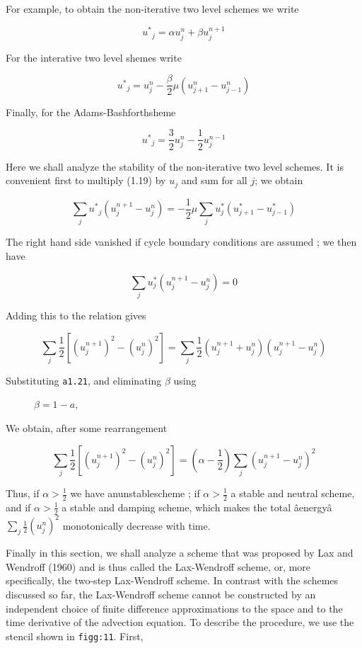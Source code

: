 For example, to obtain the non-iterative two level schemes we write

{\[{u^{*}}_{j} = \alpha u_{j}^{n} + \beta u_{j}^{n + 1}\]}

For the interative two level shemes write

{\[{u^{*}}_{j} = u_{j}^{n} - \frac{\beta}{2}\mu\left( u_{j + 1}^{n} - u_{j - 1}^{n} \right)\]}

Finally, for the Adams-Bashforthsheme

{\[{u^{*}}_{j} = \frac{3}{2}u_{j}^{n} - \frac{1}{2}u_{j}^{n - 1}\]}

Here we shall analyze the stability of the non-iterative two level
schemes. It is convenient first to multiply (1.19) by \(u_{j}\) and sum
for all \(j\); we obtain

\[\sum_{j}{u^{*}}_{j}\left( u_{j}^{n + 1} - u_{j}^{n} \right) = - \frac{1}{2}\mu\sum_{j}u^{*}_{j}\left( u^{*}_{j+1} - u^{*}_{j - 1} \right)\]

The right hand side vanished if cycle boundary conditions are assumed ;
we then have

\[\sum_{j}u^{*}_{j}\left( u_{j}^{n + 1} - u_{j}^{n} \right) = 0\]

Adding this to the relation gives

\[\sum_{j}\frac{1}{2}\left\lbrack \left( u_{j}^{n + 1} \right)^{2} - \left( u_{j}^{n} \right)^{2} \right\rbrack = \sum_{j}\frac{1}{2}\left( u_{j}^{n + 1} + u_{j}^{n} \right)\left( u_{j}^{n + 1} - u_{j}^{n} \right)\]

\begin{description}
\item[Substituting \texttt{a1.21}, and eliminating \(\beta\) using]
\(\beta = 1 - a\),
\end{description}

We obtain, after some rearrangement

{\[\sum_{j}\frac{1}{2}\left\lbrack 
\left( u_{j}^{n + 1} \right)^{2} - \left( u_{j}^{n} \right)^{2} \right\rbrack 
= \left( \alpha - \frac{1}{2} \right)\sum_{j}\left( u_{j}^{n + 1} - u_{j}^{n} \right)^{2}\]}

Thus, if \(\alpha > \frac{1}{2}\) we have anunstablescheme ; if
\(\alpha > \frac{1}{2}\) a stable and neutral scheme, and if
\(\alpha > \frac{1}{2}\) a stable and damping scheme, which makes the
total âenergyâ \(\sum_{j}\frac{1}{2}\left( u_{j}^{n} \right)^{2}\)
monotonically decrease with time.

Finally in this section, we shall analyze a scheme that was proposed by
Lax and Wendroff (1960) and is thus called the Lax-Wendroff scheme, or,
more specifically, the two-step Lax-Wendroff scheme. In contrast with
the schemes discussed so far, the Lax-Wendroff scheme cannot be
constructed by an independent choice of finite difference approximations
to the space and to the time derivative of the advection equation. To
describe the procedure, we use the stencil shown in \texttt{figg:11}.
First,


